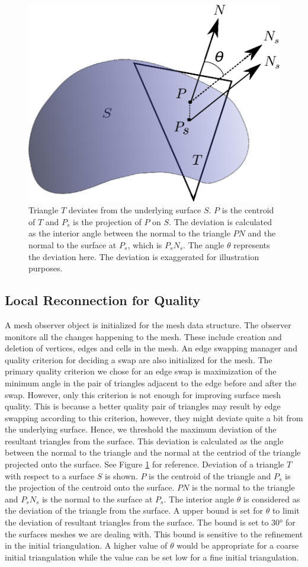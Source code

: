 \documentclass[conf]{new-aiaa}
\begin{document}
\begin{figure}[hbt!]
    \centering
    \includegraphics[width=.3\textwidth]{deviate-surface.eps}
    \caption{Triangle $T$ deviates from the underlying surface $S$. $P$ is the centroid of $T$ and $P_s$ is the projection of $P$ on $S$. The deviation is calculated as the interior angle between the normal to the triangle $PN$ and the normal to the surface at $P_s$, which is $P_sN_s$. The angle $\theta$ represents the deviation here. The deviation is exaggerated for illustration purposes.}
    \label{deviation-surface}
\end{figure}

\subsection{Local Reconnection for Quality}

A mesh observer object is initialized for the mesh data structure. The observer monitors all the changes happening to the mesh. These include creation and deletion of vertices, edges and cells in the mesh. An edge swapping manager and quality criterion for deciding a swap are also initialized for the mesh. The primary quality criterion we chose for an edge swap is maximization of the minimum angle in the pair of triangles adjacent to the edge before and after the swap. However, only this criterion is not enough for improving surface mesh quality. This is because a better quality pair of triangles may result by edge swapping according to this criterion, however, they might deviate quite a bit from the underlying surface. Hence, we threshold the maximum deviation of the resultant triangles from the surface. This deviation is calculated as the angle between the normal to the triangle and the normal at the centriod of the triangle projected onto the surface. See Figure \ref{deviation-surface} for reference. Deviation of a triangle $T$ with respect to a surface $S$ is shown. $P$ is the centroid of the triangle and $P_s$ is the projection of the centroid onto the surface. $PN$ is the normal to the triangle and $P_sN_s$ is the normal to the surface at $P_s$. The interior angle $\theta$ is considered as the deviation of the triangle from the surface. A upper bound is set for $\theta$ to limit the deviation of resultant triangles from the surface.  The bound is set to $\ang{30}$ for the surfaces meshes we are dealing with. This bound is sensitive to the refinement in the initial triangulation. A higher value of $\theta$ would be appropriate for a coarse initial triangulation while the value can be set low for a fine initial triangulation.
\end{document}
